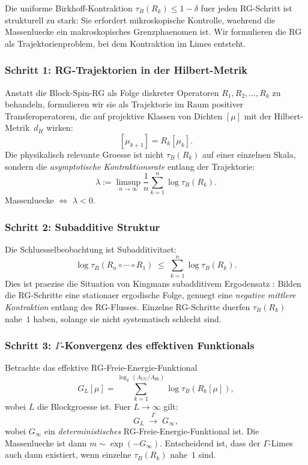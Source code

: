 \documentclass[12pt,a4paper]{article}
\theoremstyle{definition}
\theoremstyle{plain}
\theoremstyle{remark}
\begin{document}
Die uniforme Birkhoff-Kontraktion $\tau_B(R_k) \leq 1 - \delta$ fuer jeden RG-Schritt ist strukturell zu stark: Sie erfordert mikroskopische Kontrolle, waehrend die Massenluecke ein makroskopisches Grenzphaenomen ist. Wir formulieren die RG als Trajektorienproblem, bei dem Kontraktion im Limes entsteht.

\subsubsection*{Schritt 1: RG-Trajektorien in der Hilbert-Metrik}

Anstatt die Block-Spin-RG als Folge diskreter Operatoren $R_1, R_2, \ldots, R_k$ zu behandeln, formulieren wir sie als Trajektorie im Raum positiver Transferoperatoren, die auf projektive Klassen von Dichten $[\mu]$ mit der Hilbert-Metrik~$d_H$ wirken:
\[
  [\mu_{k+1}] = R_k[\mu_k].
\]
Die physikalisch relevante Groesse ist nicht $\tau_B(R_k)$ auf einer einzelnen Skala, sondern die \emph{asymptotische Kontraktionsrate} entlang der Trajektorie:
\begin{equation}\label{eq:lyapunov-rg}
  \lambda := \limsup_{n \to \infty} \frac{1}{n} \sum_{k=1}^{n} \log \tau_B(R_k).
\end{equation}
Massenluecke $\Leftrightarrow$ $\lambda < 0$.

\subsubsection*{Schritt 2: Subadditive Struktur}

Die Schluesselbeobachtung ist Subadditivitaet:
\begin{equation}\label{eq:subadditive}
  \log \tau_B(R_n \circ \cdots \circ R_1) \;\leq\; \sum_{k=1}^{n} \log \tau_B(R_k).
\end{equation}
Dies ist praezise die Situation von Kingmans subadditivem Ergodensatz \cite{Kingman1968}: Bilden die RG-Schritte eine stationaer ergodische Folge, genuegt eine \emph{negative mittlere Kontraktion} entlang des RG-Flusses. Einzelne RG-Schritte duerfen $\tau_B(R_k)$ nahe~$1$ haben, solange sie nicht systematisch schlecht sind.

\subsubsection*{Schritt 3: $\Gamma$-Konvergenz des effektiven Funktionals}

Betrachte das effektive RG-Freie-Energie-Funktional
\begin{equation}\label{eq:rg-functional}
  G_L[\mu] = \sum_{k=1}^{\log_L(\Lambda_{\mathrm{UV}}/\Lambda_{\mathrm{IR}})} \log \tau_B(R_k[\mu]),
\end{equation}
wobei $L$ die Blockgroesse ist. Fuer $L \to \infty$ gilt:
\[
  G_L \;\xrightarrow{\;\Gamma\;}\; G_\infty,
\]
wobei $G_\infty$ ein \emph{deterministisches} RG-Freie-Energie-Funktional ist. Die Massenluecke ist dann $m \sim \exp(-G_\infty)$. Entscheidend ist, dass der $\Gamma$-Limes auch dann existiert, wenn einzelne $\tau_B(R_k)$ nahe~$1$ sind.
\end{document}
